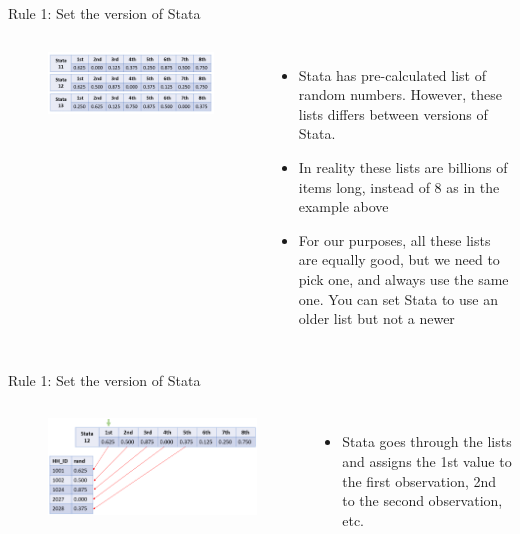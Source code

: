 \documentclass[aspectratio=169]{beamer}
\begin{document}
\begin{frame}{Rule 1: Set the version of Stata}
	\begin{columns}[c]
		\begin{figure}
			\centering
			\includegraphics[width=\linewidth]{img/rand-version.png}
		\end{figure}
		\begin{itemize}
			\item \small Stata has pre-calculated list of random numbers. However, these lists differs between versions of Stata.
			\item \small In reality these lists are billions of items long, instead of 8 as in the example above
			\item \small For our purposes, all these lists are equally good, but we need to pick one, and always use the same one. You can set Stata to use an older list but not a newer
		\end{itemize}
	\end{columns}
\end{frame}

\begin{frame}{Rule 1: Set the version of Stata}
	\begin{columns}[c]
		\begin{figure}
			\centering
			\includegraphics[width=\linewidth]{img/rule1}
		\end{figure}
		\begin{itemize}
			\item \small Stata goes through the lists and assigns the 1st value to the first observation, 2nd to the second observation, etc.
		\end{itemize}
	\end{columns}
\end{frame}
\end{document}
